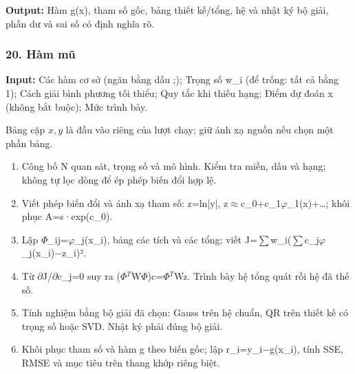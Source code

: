 \textbf{Output:} Hàm g(\allowbreak{}x),\allowbreak{} tham số gốc,\allowbreak{} bảng thiết kế/\allowbreak{}tổng,\allowbreak{} hệ và nhật ký bộ giải,\allowbreak{} phần dư và sai số có định nghĩa rõ.

\examplebreak\subsubsection*{20. Hàm mũ}

\textbf{Input:} Các hàm cơ sở (\allowbreak{}ngăn bằng dấu ;\allowbreak{});\allowbreak{} Trọng số w\_i (\allowbreak{}để trống: tất cả bằng 1);\allowbreak{} Cách giải bình phương tối thiểu;\allowbreak{} Quy tắc khi thiếu hạng;\allowbreak{} Điểm dự đoán x (\allowbreak{}không bắt buộc);\allowbreak{} Mức trình bày.

Bảng cặp $x,y$ là đầu vào riêng của lượt chạy; giữ ánh xạ nguồn nếu chọn một phần bảng.

\begin{enumerate}

\item Công bố N quan sát,\allowbreak{} trọng số và mô hình. Kiểm tra miền,\allowbreak{} dấu và hạng;\allowbreak{} không tự lọc dòng để ép phép biến đổi hợp lệ.

\item Viết phép biến đổi và ánh xạ tham số: z=\allowbreak{}ln|y|,\allowbreak{} z\ensuremath{\approx}c\_0+\allowbreak{}c\_1\ensuremath{\varphi}\_1(\allowbreak{}x)+\allowbreak{}…;\allowbreak{} khôi phục A=\allowbreak{}s·exp(\allowbreak{}c\_0).

\item Lập \ensuremath{\Phi}\_ij=\allowbreak{}\ensuremath{\varphi}\_j(\allowbreak{}x\_i),\allowbreak{} bảng các tích và các tổng;\allowbreak{} viết J=\allowbreak{}\ensuremath{\sum}w\_i(\allowbreak{}\ensuremath{\sum}c\_j\ensuremath{\varphi}\_j(\allowbreak{}x\_i)\ensuremath{-}z\_i)².

\item Từ \ensuremath{\partial}J/\allowbreak{}\ensuremath{\partial}c\_j=\allowbreak{}0 suy ra (\allowbreak{}\ensuremath{\Phi}\ensuremath{{}^T}W\ensuremath{\Phi})c=\allowbreak{}\ensuremath{\Phi}\ensuremath{{}^T}Wz. Trình bày hệ tổng quát rồi hệ đã thế số.

\item Tính nghiệm bằng bộ giải đã chọn: Gauss trên hệ chuẩn,\allowbreak{} QR trên thiết kế có trọng số hoặc SVD. Nhật ký phải đúng bộ giải.

\item Khôi phục tham số và hàm g theo biến gốc;\allowbreak{} lập r\_i=\allowbreak{}y\_i\ensuremath{-}g(\allowbreak{}x\_i),\allowbreak{} tính SSE,\allowbreak{} RMSE và mục tiêu trên thang khớp riêng biệt.

\end{enumerate}

